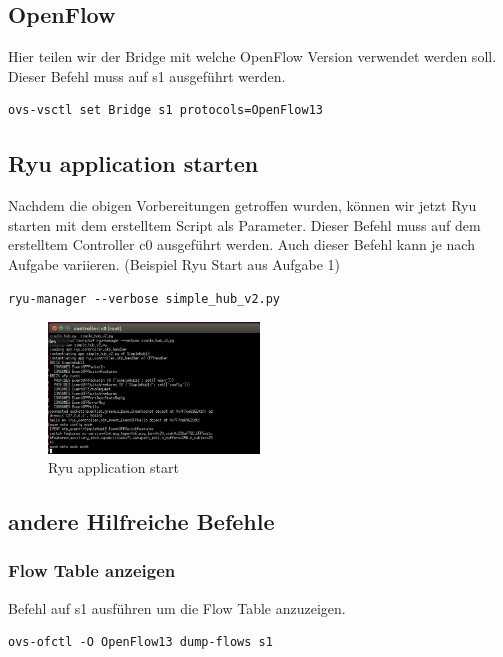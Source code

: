 \documentclass[a4,12pt]{scrartcl}
\begin{document}
\subsection{OpenFlow}
Hier teilen wir der Bridge mit welche OpenFlow Version verwendet werden soll. Dieser Befehl muss auf s1 ausgeführt werden. 
\begin{lstlisting}
ovs-vsctl set Bridge s1 protocols=OpenFlow13
\end{lstlisting}

\subsection{Ryu application starten}
Nachdem die obigen Vorbereitungen getroffen wurden, können wir jetzt Ryu starten mit dem erstelltem Script als Parameter. Dieser Befehl muss auf dem erstelltem Controller c0 ausgeführt werden. Auch dieser Befehl kann je nach Aufgabe variieren. (Beispiel Ryu Start aus Aufgabe 1) 
\begin{lstlisting}
ryu-manager --verbose simple_hub_v2.py
\end{lstlisting}
\begin{figure} [H]
	\begin{center}
	\includegraphics[width=0.50\textwidth]{./pictures/ryu_start_simple_hub.png}
	\caption{Ryu application start}
	\label{x}
	\end{center}
\end{figure} 

\subsection{andere Hilfreiche Befehle}
\subsubsection{Flow Table anzeigen}
Befehl auf s1 ausführen um die Flow Table anzuzeigen. 
\begin{lstlisting}
ovs-ofctl -O OpenFlow13 dump-flows s1
\end{lstlisting}
\newpage
\end{document}
